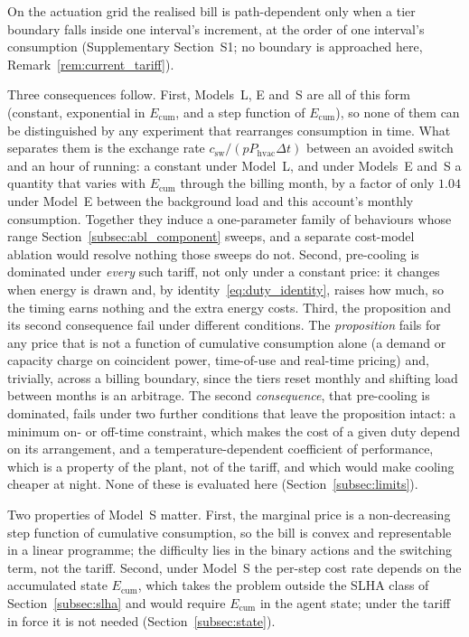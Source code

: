 \documentclass[pdflatex,sn-mathphys-num,iicol]{sn-jnl}
\theoremstyle{thmstyleone}\newtheorem{proposition}{Proposition}\newtheorem{corollary}{Corollary}
\theoremstyle{thmstyletwo}\newtheorem{remark}{Remark}\newtheorem{observation}{Observation}
\theoremstyle{thmstylethree}\newtheorem{definition}{Definition}
\newcommand{\csw}{c_{\mathrm{sw}}}
\newcommand{\Phvac}{P_{\mathrm{hvac}}}
\begin{document}
On the actuation grid the realised bill is path-dependent only when a tier boundary falls inside one interval's increment, at the order of one interval's consumption (Supplementary Section~S1; no boundary is approached here, Remark~\ref{rem:current_tariff}).

Three consequences follow. First, Models~L, E and~S are all of this form (constant, exponential in $E_{\mathrm{cum}}$, and a step function of $E_{\mathrm{cum}}$), so none of them can be distinguished by any experiment that rearranges consumption in time. What separates them is the exchange rate $\csw/(p\Phvac\Delta t)$ between an avoided switch and an hour of running: a constant under Model~L, and under Models~E and~S a quantity that varies with $E_{\mathrm{cum}}$ through the billing month, by a factor of only $1.04$ under Model~E between the background load and this account's monthly consumption. Together they induce a one-parameter family of behaviours whose range Section~\ref{subsec:abl_component} sweeps, and a separate cost-model ablation would resolve nothing those sweeps do not. Second, pre-cooling is dominated under \emph{every} such tariff, not only under a constant price: it changes when energy is drawn and, by identity~\eqref{eq:duty_identity}, raises how much, so the timing earns nothing and the extra energy costs. Third, the proposition and its second consequence fail under different conditions. The \emph{proposition} fails for any price that is not a function of cumulative consumption alone (a demand or capacity charge on coincident power, time-of-use and real-time pricing) and, trivially, across a billing boundary, since the tiers reset monthly and shifting load between months is an arbitrage. The second \emph{consequence}, that pre-cooling is dominated, fails under two further conditions that leave the proposition intact: a minimum on- or off-time constraint, which makes the cost of a given duty depend on its arrangement, and a temperature-dependent coefficient of performance, which is a property of the plant, not of the tariff, and which would make cooling cheaper at night. None of these is evaluated here (Section~\ref{subsec:limits}).

Two properties of Model~S matter. First, the marginal price is a non-decreasing step function of cumulative consumption, so the bill is convex and representable in a linear programme; the difficulty lies in the binary actions and the switching term, not the tariff. Second, under Model~S the per-step cost rate depends on the accumulated state $E_{\mathrm{cum}}$, which takes the problem outside the SLHA class of Section~\ref{subsec:slha} and would require $E_{\mathrm{cum}}$ in the agent state; under the tariff in force it is not needed (Section~\ref{subsec:state}).
\end{document}

